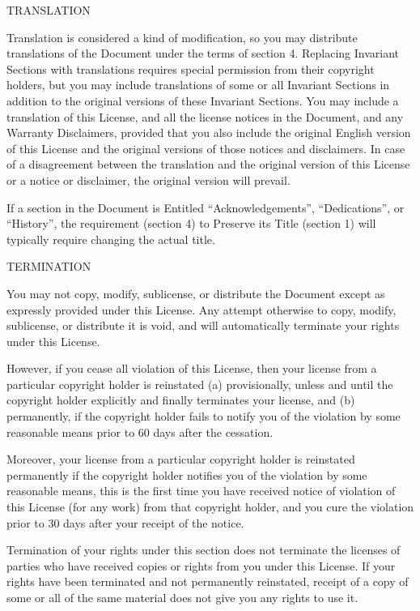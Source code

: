 \item
TRANSLATION

Translation is considered a kind of modification, so you may distribute translations of the Document under the terms of section 4. Replacing Invariant Sections with translations requires special permission from their copyright holders, but you may include translations of some or all Invariant Sections in addition to the original versions of these Invariant Sections.  You may include a translation of this License, and all the license notices in the Document, and any Warranty Disclaimers, provided that you also include the original English version of this License and the original versions of those notices and disclaimers.  In case of a disagreement between the translation and the original version of this License or a notice or disclaimer, the original version will prevail.

If a section in the Document is Entitled ``Acknowledgements'', ``Dedications'', or ``History'', the requirement (section 4) to Preserve its Title (section 1) will typically require changing the actual title.

\item
TERMINATION

You may not copy, modify, sublicense, or distribute the Document except as expressly provided under this License.  Any attempt otherwise to copy, modify, sublicense, or distribute it is void, and will automatically terminate your rights under this License.

However, if you cease all violation of this License, then your license from a particular copyright holder is reinstated (a) provisionally, unless and until the copyright holder explicitly and finally terminates your license, and (b) permanently, if the copyright holder fails to notify you of the violation by some reasonable means prior to 60 days after the cessation.

Moreover, your license from a particular copyright holder is reinstated permanently if the copyright holder notifies you of the violation by some reasonable means, this is the first time you have received notice of violation of this License (for any work) from that copyright holder, and you cure the violation prior to 30 days after your receipt of the notice.

Termination of your rights under this section does not terminate the licenses of parties who have received copies or rights from you under this License.  If your rights have been terminated and not permanently reinstated, receipt of a copy of some or all of the same material does not give you any rights to use it.

